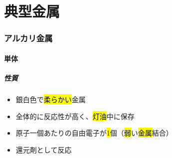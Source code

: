 \part{典型金属}
\section{アルカリ金属}
\subsection{単体}
\subsubsection{性質}
\begin{itemize}
    \item 銀白色で\hl{柔らかい}金属
    \item 全体的に反応性が高く、\hl{灯油}中に保存
    \item 原子一個あたりの自由電子が\hl{1}個（\hl{弱}い\hl{金属}結合）
    \item 還元剤として反応\\
\end{itemize}
